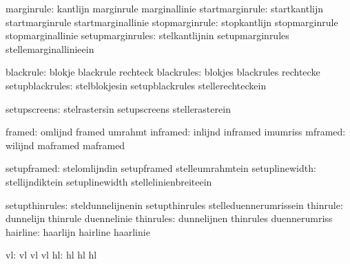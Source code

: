                    marginrule:  kantlijn                     marginrule
                                marginallinie
              startmarginrule:  startkantlijn                startmarginrule
                                startmarginallinie
               stopmarginrule:  stopkantlijn                 stopmarginrule
                                stopmarginallinie
             setupmarginrules:  stelkantlijnin               setupmarginrules
                                stellemarginallinieein

                    blackrule:  blokje                       blackrule
                                rechteck
                   blackrules:  blokjes                      blackrules
                                rechtecke
              setupblackrules:  stelblokjesin                setupblackrules
                                stellerechteckein

                 setupscreens:  stelrastersin                setupscreens
                                stellerasterein

                       framed:  omlijnd                      framed
                                umrahmt
                     inframed:  inlijnd                      inframed
                                imumriss
                      mframed:  wilijnd                      maframed
                                maframed 

                  setupframed:  stelomlijndin                setupframed
                                stelleumrahmtein
               setuplinewidth:  stellijndiktein              setuplinewidth
                                stellelinienbreiteein

               setupthinrules:  steldunnelijnenin            setupthinrules
                                stelleduennerumrissein
                     thinrule:  dunnelijn                    thinrule
                                duennelinie
                    thinrules:  dunnelijnen                  thinrules
                                duennerumriss
                     hairline:  haarlijn                     hairline
                                haarlinie

                           vl:  vl                           vl
                                vl
                           hl:  hl                           hl
                                hl

